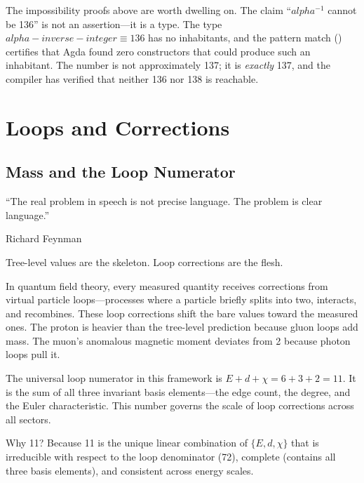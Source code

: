 \documentclass[11pt,a4paper]{book}
\def\alpha{alpha}%
\def\texttt#1{#1}%
\def\text#1{#1}%
\begin{document}
The impossibility proofs above are worth dwelling on. The claim ``$\alpha^{-1}$ cannot be 136'' is not an assertion---it is a type. The type $\alpha\text{-inverse-integer} \equiv 136$ has no inhabitants, and the pattern match \texttt{()} certifies that Agda found zero constructors that could produce such an inhabitant. The number is not approximately 137; it is \emph{exactly} 137, and the compiler has verified that neither 136 nor 138 is reachable.

\part{Loops and Corrections}

\chapter{Mass and the Loop Numerator}
\label{ch:mass-loop-numerator}

\epigraph{``The real problem in speech is not precise language. The problem is clear language.''}{Richard Feynman}

Tree-level values are the skeleton. Loop corrections are the flesh.

In quantum field theory, every measured quantity receives corrections from virtual particle loops---processes where a particle briefly splits into two, interacts, and recombines. These loop corrections shift the bare values toward the measured ones. The proton is heavier than the tree-level prediction because gluon loops add mass. The muon's anomalous magnetic moment deviates from 2 because photon loops pull it.

The universal loop numerator in this framework is $E + d + \chi = 6 + 3 + 2 = 11$. It is the sum of all three invariant basis elements---the edge count, the degree, and the Euler characteristic. This number governs the scale of loop corrections across all sectors.

Why 11? Because 11 is the unique linear combination of $\{E, d, \chi\}$ that is irreducible with respect to the loop denominator (72), complete (contains all three basis elements), and consistent across energy scales.%
\end{document}

